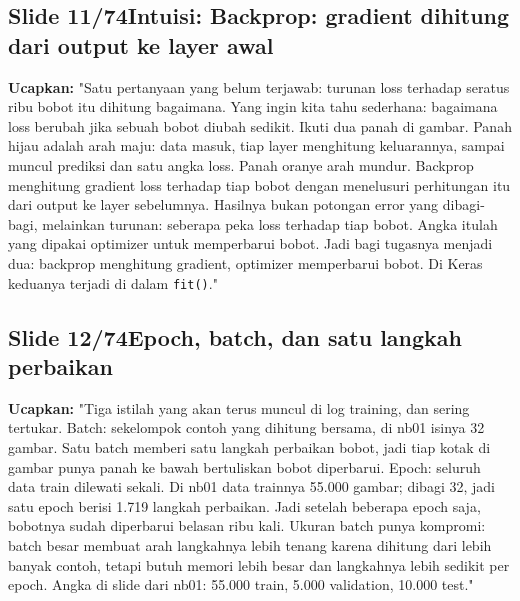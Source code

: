 \documentclass[11pt]{article}
\renewcommand{\framebox}[1]{\colorbox{acc!15}{\textcolor{acc}{\textbf{#1}}}}
\begin{document}
\subsection*{\framebox{Slide 11/74}\quad Intuisi: Backprop: gradient dihitung dari output ke layer awal}
\textbf{Ucapkan:} "Satu pertanyaan yang belum terjawab: turunan loss terhadap seratus ribu bobot itu dihitung bagaimana. Yang ingin kita tahu sederhana: bagaimana loss berubah jika sebuah bobot diubah sedikit. Ikuti dua panah di gambar. Panah hijau adalah arah maju: data masuk, tiap layer menghitung keluarannya, sampai muncul prediksi dan satu angka loss. Panah oranye arah mundur. Backprop menghitung gradient loss terhadap tiap bobot dengan menelusuri perhitungan itu dari output ke layer sebelumnya. Hasilnya bukan potongan error yang dibagi-bagi, melainkan turunan: seberapa peka loss terhadap tiap bobot. Angka itulah yang dipakai optimizer untuk memperbarui bobot. Jadi bagi tugasnya menjadi dua: backprop menghitung gradient, optimizer memperbarui bobot. Di Keras keduanya terjadi di dalam \texttt{fit()}."\\[2pt]

\subsection*{\framebox{Slide 12/74}\quad Epoch, batch, dan satu langkah perbaikan}
\textbf{Ucapkan:} "Tiga istilah yang akan terus muncul di log training, dan sering tertukar. Batch: sekelompok contoh yang dihitung bersama, di nb01 isinya 32 gambar. Satu batch memberi satu langkah perbaikan bobot, jadi tiap kotak di gambar punya panah ke bawah bertuliskan bobot diperbarui. Epoch: seluruh data train dilewati sekali. Di nb01 data trainnya 55.000 gambar; dibagi 32, jadi satu epoch berisi 1.719 langkah perbaikan. Jadi setelah beberapa epoch saja, bobotnya sudah diperbarui belasan ribu kali. Ukuran batch punya kompromi: batch besar membuat arah langkahnya lebih tenang karena dihitung dari lebih banyak contoh, tetapi butuh memori lebih besar dan langkahnya lebih sedikit per epoch. Angka di slide dari nb01: 55.000 train, 5.000 validation, 10.000 test."\\[2pt]
\end{document}
